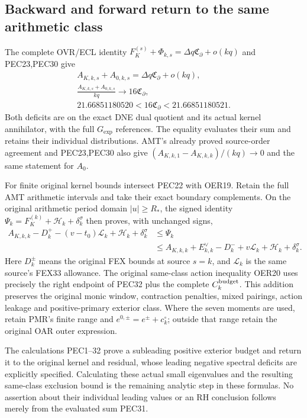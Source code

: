 \documentclass[11pt,a4paper]{article}
\begin{document}
\subsection{Backward and forward return to the same arithmetic class}
The complete OVR/ECL identity $F_K^{(s)}+\Phi_{k,s}
=\Delta q\mathfrak C_\partial+o(kq)$ and PEC23,PEC30 give
\[
\begin{gathered}
 A_{K,k,s}+A_{0,k,s}=\Delta q\mathfrak C_\partial+o(kq),\\
 \frac{A_{K,k,s}+A_{0,k,s}}{kq}\longrightarrow16\mathfrak C_\partial,\\
 21.66851180520<16\mathfrak C_\partial<21.66851180521.
\end{gathered}
 \tag{PEC31}
\]
Both deficits are on the exact DNE dual quotient and its actual
kernel annihilator, with the full $G_{\exp}$ references. The equality
evaluates their sum and retains their individual distributions.
AMT's already proved source-order agreement and PEC23,PEC30 also
give $(A_{K,k,1}-A_{K,k,k})/(kq)\to0$ and the same statement for $A_0$.

For finite original kernel bounds intersect PEC22 with OER19. Retain
the full AMT arithmetic intervals and take their exact boundary
complements. On the original arithmetic period domain $|u|\ge R_*$,
the signed identity $\Psi_k=F_K^{(k)}+\mathcal H_k+\delta_k^\sigma$
then proves, with unchanged signs,
\[
\begin{split}
 A_{K,k,k}-D_k^+-(v-t_0)\mathcal L_k
       +\mathcal H_k+\delta_k^\sigma
 &\le\Psi_k\\
 &\le A_{K,k,k}+E_{k,k}^{\vee}-D_k^-+v\mathcal L_k
       +\mathcal H_k+\delta_k^\sigma .
\end{split}\tag{PEC32}
\]
Here $D_k^\pm$ means the original FEX bounds at source $s=k$,
and $\mathcal L_k$ is the same source's FEX33 allowance. The original
same-class action inequality OER20 uses precisely the right endpoint
of PEC32 plus the complete $C_k^{\rm budget}$. This addition preserves
the original monic window, contraction penalties, mixed pairings,
action leakage and positive-primary exterior class. Where the seven
moments are used, retain PMR's finite range and $e^{0,\pm}=e^\pm+c_k^\circ$;
outside that range retain the original OAR outer expression.

The calculations PEC1--32 prove a subleading positive exterior budget
and return it to the original kernel and residual, whose leading
negative spectral deficits are explicitly specified. Calculating
these actual small eigenvalues and the resulting same-class exclusion
bound is the remaining analytic step in these formulas. No assertion
about their individual leading values or an RH conclusion follows
merely from the evaluated sum PEC31.
\end{document}
